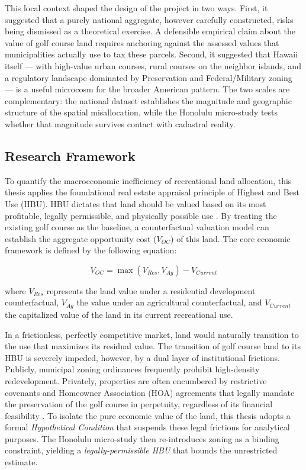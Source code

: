 \documentclass[11pt, letterpaper]{article}
\begin{document}
This local context shaped the design of the project in two ways. First, it suggested that a purely national aggregate, however carefully constructed, risks being dismissed as a theoretical exercise. A defensible empirical claim about the value of golf course land requires anchoring against the assessed values that municipalities actually use to tax these parcels. Second, it suggested that Hawaii itself --- with high-value urban courses, rural courses on the neighbor islands, and a regulatory landscape dominated by Preservation and Federal/Military zoning --- is a useful microcosm for the broader American pattern. The two scales are complementary: the national dataset establishes the magnitude and geographic structure of the spatial misallocation, while the Honolulu micro-study tests whether that magnitude survives contact with cadastral reality.

\subsection{Research Framework}

To quantify the macroeconomic inefficiency of recreational land allocation, this thesis applies the foundational real estate appraisal principle of Highest and Best Use (HBU). HBU dictates that land should be valued based on its most profitable, legally permissible, and physically possible use \parencite{AppraisalInstitute2020}. By treating the existing golf course as the baseline, a counterfactual valuation model can establish the aggregate opportunity cost ($V_{OC}$) of this land. The core economic framework is defined by the following equation:

\begin{equation}
    V_{OC} = \max(V_{Res}, V_{Ag}) - V_{Current}
\end{equation}

\noindent where $V_{Res}$ represents the land value under a residential development counterfactual, $V_{Ag}$ the value under an agricultural counterfactual, and $V_{Current}$ the capitalized value of the land in its current recreational use.

In a frictionless, perfectly competitive market, land would naturally transition to the use that maximizes its residual value. The transition of golf course land to its HBU is severely impeded, however, by a dual layer of institutional frictions. Publicly, municipal zoning ordinances frequently prohibit high-density redevelopment. Privately, properties are often encumbered by restrictive covenants and Homeowner Association (HOA) agreements that legally mandate the preservation of the golf course in perpetuity, regardless of its financial feasibility \parencite{Ellickson2022, Korngold2024}. To isolate the pure economic value of the land, this thesis adopts a formal \textit{Hypothetical Condition} \parencite{AppraisalInstitute2020} that suspends these legal frictions for analytical purposes. The Honolulu micro-study then re-introduces zoning as a binding constraint, yielding a \textit{legally-permissible HBU} that bounds the unrestricted estimate.
\end{document}
